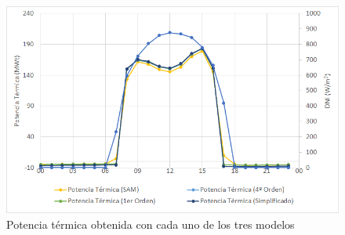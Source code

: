 \begin{figure}[!h]
\includegraphics[width=0.9\linewidth]{images/potencias_modelos.png}
\caption{Potencia térmica obtenida con cada uno de los tres modelos} 
\label{fig:potencia_modelos}
\end{figure}



